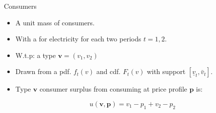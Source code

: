 \documentclass{class}
\begin{document}

\begin{frame}{Consumers}

\begin{itemize}
    \item A unit mass of consumers.

\vfill

    \item With a  for electricity for each two periods $t = 1,2$.

\vfill

    \item W.t.p: a  type $\textbf{v}=(v_1,v_2) $
    
\vfill

 \item Drawn from a pdf. $f_t(v)$ and cdf. $F_t(v)$ with support $[\underline{v}_t,\bar{v}_t]$. 
            





\vfill

\item Type $\textbf{v}$ consumer surplus from consuming at price profile $\textbf{p}$ is:

\begin{equation*}
 u\left(\textbf{v},\textbf{p}\right)= v_1-p_1 +  v_2-p_2
 \end{equation*}
\end{itemize}    
\end{frame}

\end{document}
